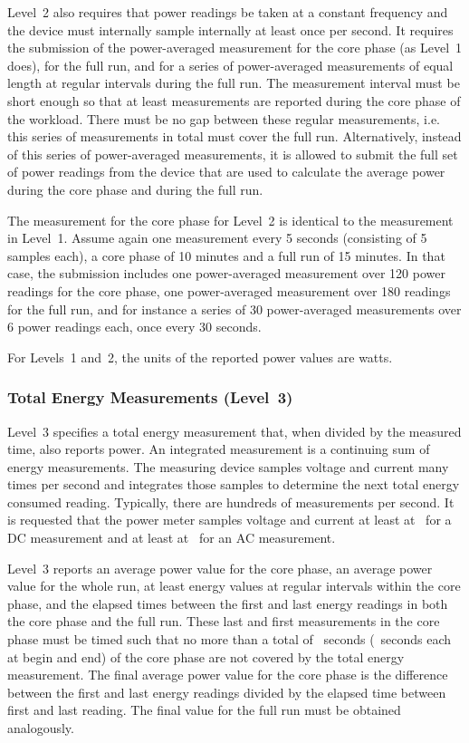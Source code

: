 \noindent
Level~2 also requires that power readings be taken at a constant frequency and the device must internally sample internally at least once per second.
It requires the submission of the power-averaged measurement for the core phase (as Level~1 does), for the full run, and for a series of power-averaged measurements of equal length at regular intervals during the full run.
The measurement interval must be short enough so that at least \MinMeasurementsCorePhaseLTwoThree{} measurements are reported during the core phase of the workload.
There must be no gap between these regular measurements, i.e. this series of measurements in total must cover the full run.
Alternatively, instead of this series of power-averaged measurements, it is allowed to submit the full set of power readings from the device that are used to calculate the average power during the core phase and during the full run.
\wl

\noindent
The measurement for the core phase for Level~2 is identical to the measurement in Level~1.
Assume again one measurement every 5 seconds (consisting of 5 samples each), a core phase of 10 minutes and a full run of 15 minutes.
In that case, the submission includes one power-averaged measurement over 120 power readings for the core phase, one power-averaged measurement over 180 readings for the full run, and for instance a series of 30 power-averaged measurements over 6 power readings each, once every 30 seconds.
\wl

\noindent
For Levels~1 and~2, the units of the reported power values are watts.
\wl

\subsubsection{Total Energy Measurements (Level~3)}

\noindent
Level~3 specifies a total energy measurement that, when divided by the measured time, also reports power.
An integrated measurement is a continuing sum of energy measurements.
The measuring device samples voltage and current many times per second and integrates those samples to determine the next total energy consumed reading.
Typically, there are hundreds of measurements per second.
It is requested that the power meter samples voltage and current at least at~\SpecRateLThreeDC{} for a DC measurement and at least at~\SpecRateLThreeAC{} for an AC measurement.
\wl

\noindent
Level~3 reports an average power value for the core phase, an average power value for the whole run, at least \MinMeasurementsCorePhaseLTwoThree{} energy values at regular intervals within the core phase, and the elapsed times between the first and last energy readings in both the core phase and the full run.
These last and first measurements in the core phase must be timed such that no more than a total of \MaxSecMissingLThree{}~seconds (\MaxSecMissingLThreeHalf{}~seconds each at begin and end) of the core phase are not covered by the total energy measurement.
The final average power value for the core phase is the difference between the first and last energy readings divided by the elapsed time between first and last reading.
The final value for the full run must be obtained analogously.
\wl

